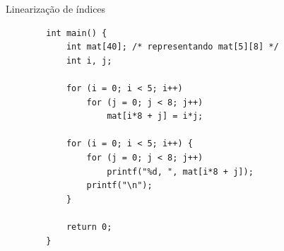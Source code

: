 \documentclass[handout]{beamer}
\begin{document}
\begin{frame}[fragile]{Linearização de índices}

    \begin{verbatim}
        int main() {
            int mat[40]; /* representando mat[5][8] */
            int i, j;
            
            for (i = 0; i < 5; i++)
                for (j = 0; j < 8; j++)
                    mat[i*8 + j] = i*j;

            for (i = 0; i < 5; i++) {
                for (j = 0; j < 8; j++)
                    printf("%d, ", mat[i*8 + j]);
                printf("\n");
            }

            return 0;
        }
    \end{verbatim}

\end{frame}
\end{document}
